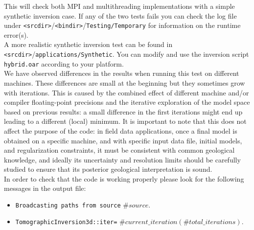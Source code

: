 \documentclass[twoside,final,onecolumn]{article}
\begin{document}
This will check both MPI and multithreading implementations with a simple synthetic inversion case.
If any of the two tests fails you can check the log file under \verb+<srcdir>+/\verb+<bindir>+/\verb+Testing/Temporary+ for information on the runtime error(s).\\
\newline
A more realistic synthetic inversion test can be found in \verb+<srcdir>+/\verb+applications/Synthetic+.
You can modify and use the inversion script \verb+hybrid.oar+ according to your platform.\\
\newline
We have observed differences in the results when running this test on different machines. These differences are small at the beginning but they sometimes grow with iterations. 
This is caused by the combined effect of different machine and/or compiler floating-point precisions and the iterative exploration of the model space based on previous results: 
a small difference in the first iterations might end up leading to a different (local) minimum. It is important to note that this does not affect the purpose of the code: 
in field data applications, once a final model is obtained on a specific machine, and with specific input data file, initial models, and regularization constraints, 
it must be consistent with common geological knowledge, and ideally its uncertainty and resolution limits should be carefully studied to ensure that its posterior geological interpretation is sound.\\
\newline
In order to check that the code is working properly please look for the following messages in the output file: 
\begin{itemize}
\item \verb+Broadcasting paths from source+ $\#source$. 
\item \verb+TomographicInversion3d::iter=+ $\#current\_iteration(\#total\_iterations)$.
\end{itemize}
\end{document}
